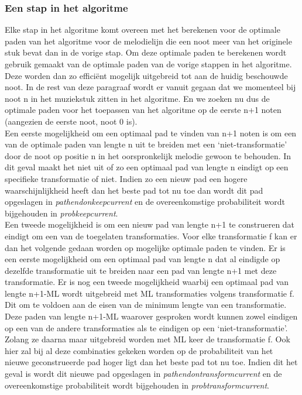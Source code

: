 \subsubsection{Een stap in het algoritme}
Elke stap in het algoritme komt overeen met het berekenen voor de optimale paden van het algoritme voor de melodielijn die een noot meer van het originele stuk bevat dan in de vorige stap. Om deze optimale paden te berekenen wordt gebruik gemaakt van de optimale paden van de vorige stappen in het algoritme. Deze worden dan zo effici\"ent mogelijk uitgebreid tot aan de huidig beschouwde noot. In de rest van deze paragraaf wordt er vanuit gegaan dat we momenteel bij noot n in het muziekstuk zitten in het algoritme. En we zoeken nu dus de optimale paden voor het toepassen van het algoritme op de eerste n+1 noten (aangezien de eerste noot, noot 0 is).\\
Een eerste mogelijkheid om een optimaal pad te vinden van n+1 noten is om een van de optimale paden van lengte n uit te breiden met een `niet-transformatie' door de noot op positie n in het oorspronkelijk melodie gewoon te behouden. In dit geval maakt het niet uit of zo een optimaal pad van lengte n eindigt op een specifieke transformatie of niet. Indien zo een nieuw pad een hogere waarschijnlijkheid heeft dan het beste pad tot nu toe dan wordt dit pad opgeslagen in \textit{path\textunderscore end\textunderscore on\textunderscore keep\textunderscore current} en de overeenkomstige probabiliteit wordt bijgehouden in \textit{prob\textunderscore keep\textunderscore current}.\\
Een tweede mogelijkheid is om een nieuw pad van lengte n+1 te construeren dat eindigt om een van de toegelaten transformaties. Voor elke transformatie f kan er dan het volgende gedaan worden op mogelijke optimale paden te vinden. Er is een eerste mogelijkheid om een optimaal pad van lengte n dat al eindigde op dezelfde transformatie uit te breiden naar een pad van lengte n+1 met deze transformatie. Er is nog een tweede mogelijkheid waarbij een optimaal pad van lengte n+1-ML wordt uitgebreid met ML transformaties volgens transformatie f. Dit om te voldoen aan de eisen van de minimum lengte van een transformatie. Deze paden van lengte n+1-ML waarover gesproken wordt kunnen zowel eindigen op een van de andere transformaties als te eindigen op een `niet-transformatie'. Zolang ze daarna maar uitgebreid worden met ML keer de transformatie f. Ook hier zal bij al deze combinaties gekeken worden op de probabiliteit van het nieuwe geconstrueerde pad hoger ligt dan het beste pad tot nu toe. Indien dit het geval is wordt dit nieuwe pad opgeslagen in \textit{path\textunderscore end\textunderscore on\textunderscore transform\textunderscore current} en de overeenkomstige probabiliteit wordt bijgehouden in \textit{prob\textunderscore transform\textunderscore current}.\\
